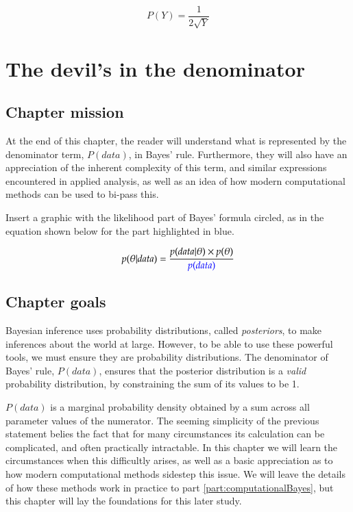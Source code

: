 \documentclass[11pt,fullpage]{book}
\begin{document}
\begin{equation}\label{eq:Prior_appChangeOfVariablesSolved}
P(Y) = \frac{1}{2\sqrt{Y}}
\end{equation}


\chapter{The devil's in the denominator}\label{chap:denominator}
\section{Chapter mission}
At the end of this chapter, the reader will understand what is represented by the denominator term, $P(data)$, in Bayes' rule. Furthermore, they will also have an appreciation of the inherent complexity of this term, and similar expressions encountered in applied analysis, as well as an idea of how modern computational methods can be used to bi-pass this.

Insert a graphic with the likelihood part of Bayes' formula circled, as in the equation shown below for the part highlighted in blue.

\begin{equation}
p(\theta|data) = \frac{p(data|\theta)\times p(\theta)}{{\color{blue}p(data)}}
\end{equation}\label{eq:Denominator_BayesHighlighted}


\section{Chapter goals}
Bayesian inference uses probability distributions, called \textit{posteriors}, to make inferences about the world at large. However, to be able to use these powerful tools, we must ensure they are probability distributions. The denominator of Bayes' rule, $P(data)$, ensures that the posterior distribution is a \textit{valid} probability distribution, by constraining the sum of its values to be 1. 

$P(data)$ is a marginal probability density obtained by a sum across all parameter values of the numerator. The seeming simplicity of the previous statement belies the fact that for many circumstances its calculation can be complicated, and often practically intractable. In this chapter we will learn the circumstances when this difficultly arises, as well as a basic appreciation as to how modern computational methods sidestep this issue. We will leave the details of how these methods work in practice to part \ref{part:computationalBayes}, but this chapter will lay the foundations for this later study.
\end{document}
